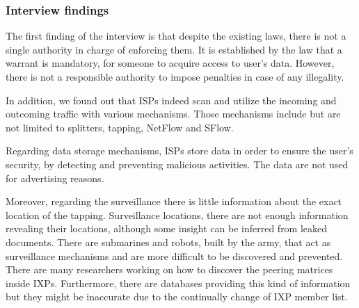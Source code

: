 \subsubsection{Interview findings}

The first finding of the interview is that despite the existing laws, there is 
not a single authority in charge of enforcing them. It is established by the law 
that a warrant is mandatory, for someone to acquire access to  user's data. 
However, there is not a responsible authority to impose penalties in case of any 
illegality.

In addition, we found out that ISPs indeed scan and utilize the incoming and 
outcoming traffic with various mechanisms. Those mechanisms include but are not 
limited to splitters, tapping, NetFlow and SFlow.

Regarding data storage mechanisms, ISPs store data in order to ensure the user's 
security, by detecting and preventing malicious activities. The data are not 
used for advertising reasons.

Moreover, regarding the surveillance there is little information about the exact 
location of the tapping. Surveillance locations, there are not enough 
information revealing their locations, although some insight can be inferred 
from leaked documents. There are submarines and robots, built by the army, that 
act as surveillance mechanisms and are more difficult to be discovered and 
prevented.  There are many researchers working on how to discover the peering 
matrices inside IXPs. Furthermore, there are databases providing this kind of 
information but they might be inaccurate due to the continually change of IXP 
member list.

